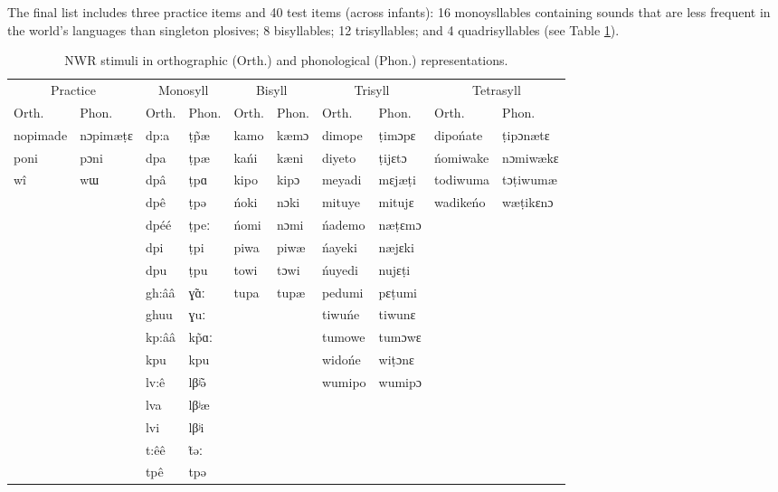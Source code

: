 \documentclass[english,,man,floatsintext]{apa6}
\begin{document}
The final list includes three practice items and 40 test items (across infants): 16 monoysllables containing sounds that are less frequent in the world's languages than singleton plosives; 8 bisyllables; 12 trisyllables; and 4 quadrisyllables (see Table \ref{tab:tabstims}).

\begin{table}

\caption{\label{tab:tabstims}NWR stimuli in orthographic (Orth.) and phonological (Phon.) representations.}
\centering
\begin{tabular}[t]{llllllllll}
\toprule
\multicolumn{2}{c}{Practice} & \multicolumn{2}{c}{Monosyll} & \multicolumn{2}{c}{Bisyll} & \multicolumn{2}{c}{Trisyll} & \multicolumn{2}{c}{Tetrasyll} \\
\cmidrule(l{3pt}r{3pt}){1-2} \cmidrule(l{3pt}r{3pt}){3-4} \cmidrule(l{3pt}r{3pt}){5-6} \cmidrule(l{3pt}r{3pt}){7-8} \cmidrule(l{3pt}r{3pt}){9-10}
Orth. & Phon. & Orth. & Phon. & Orth. & Phon. & Orth. & Phon. & Orth. & Phon.\\
\midrule
nopimade & nɔpimæṭɛ & dp:a & ṭp̃æ & kamo & kæmɔ & dimope & ṭimɔpɛ & dipońate & ṭipɔnætɛ\\
poni & pɔni & dpa & ṭpæ & kańi & kæni & diyeto & ṭijɛtɔ & ńomiwake & nɔmiwækɛ\\
wî & wɯ & dpâ & ṭpɑ & kipo & kipɔ & meyadi & mɛjæṭi & todiwuma & tɔṭiwumæ\\
 &  & dpê & ṭpə & ńoki & nɔki & mituye & mitujɛ & wadikeńo & wæṭikɛnɔ\\
 &  & dpéé & ṭpeː & ńomi & nɔmi & ńademo & næṭɛmɔ &  & \\
\addlinespace
 &  & dpi & ṭpi & piwa & piwæ & ńayeki & næjɛki &  & \\
 &  & dpu & ṭpu & towi & tɔwi & ńuyedi & nujɛṭi &  & \\
 &  & gh:ââ & ɣ̃ɑː & tupa & tupæ & pedumi & pɛṭumi &  & \\
 &  & ghuu & ɣuː &  &  & tiwuńe & tiwunɛ &  & \\
 &  & kp:ââ & kp̃ɑː &  &  & tumowe & tumɔwɛ &  & \\
\addlinespace
 &  & kpu & kpu &  &  & widońe & wiṭɔnɛ &  & \\
 &  & lv:ê & lβʲ̃ə &  &  & wumipo & wumipɔ &  & \\
 &  & lva & lβʲæ &  &  &  &  &  & \\
 &  & lvi & lβʲi &  &  &  &  &  & \\
 &  & t:êê & t̃əː &  &  &  &  &  & \\
\addlinespace
 &  & tpê & tpə &  &  &  &  &  & \\
\bottomrule
\end{tabular}
\end{table}
\end{document}
